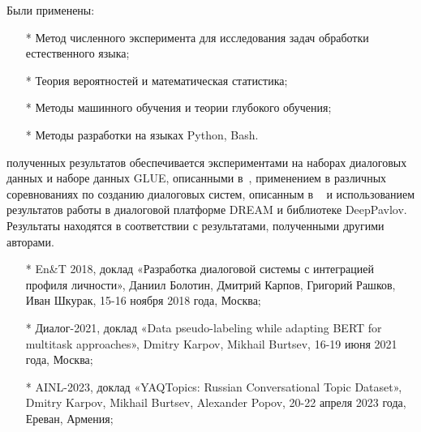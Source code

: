 {\methods}
Были
применены: %
\begin{enumerate}
\item[*] Метод численного эксперимента для исследования задач обработки естественного языка;
\item[*] Теория вероятностей и математическая статистика;
\item[*] Методы машинного обучения и теории глубокого обучения;
\item[*] Методы разработки на языках Python, Bash.
\end{enumerate}




{\reliability} полученных результатов обеспечивается экспериментами на наборах диалоговых данных и наборе данных GLUE, описанными в~\cite{pseudolabel,rumtl,enmtl,rutopics,dp_2023}, применением в различных соревнованиях по созданию диалоговых систем, описанным в ~\cite{dream1,dream2,dream1_trudy,Болотин_Карпов_Рашков_Шкурак_2019} и использованием результатов работы в диалоговой платформе DREAM и библиотеке DeepPavlov. Результаты находятся в соответствии с результатами, полученными другими авторами.

{\probation}
\begin{itemize}
    \item[*] En\&T 2018, доклад «Разработка диалоговой системы с интеграцией профиля личности», Даниил Болотин, Дмитрий Карпов, Григорий Рашков, Иван Шкурак, 15-16 ноября 2018 года, Москва;
    \item[*] Диалог-2021, доклад «Data pseudo-labeling while adapting BERT for multitask approaches», Dmitry Karpov, Mikhail Burtsev, 16-19 июня 2021 года, Москва;
    \item[*] AINL-2023, доклад «YAQTopics: Russian Conversational Topic Dataset», Dmitry Karpov, Mikhail Burtsev, Alexander Popov, 20-22 апреля 2023 года, Ереван, Армения;
\end{itemize}%


